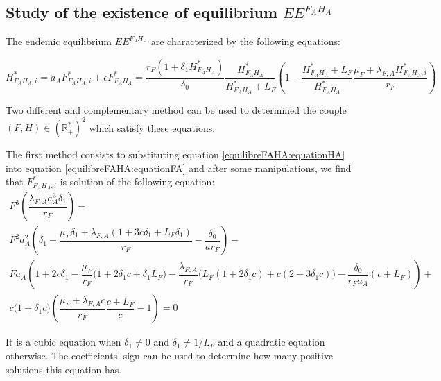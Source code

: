 \documentclass{article}
\newcommand{\lfa}{\lambda_{F, A}}
\begin{document}
\newpage



\newpage
\begin{appendices}
\section{Study of the existence of equilibrium $EE^{F_AH_A}$ \label{appendix:equilibreFAHA}}
The endemic equilibrium $EE^{F_AH_A}$ are characterized by the following equations:

\begin{subequations}
\begin{equation}
H^*_{F_AH_A, i} = a_A F^*_{F_AH_A, i} + c
\label{equilibreFAHA:equationHA}
\end{equation}
\begin{equation}
F^*_{F_AH_A} = \dfrac{r_F(1+\delta_1 H^*_{F_AH_A})}{\delta_0} \dfrac{H^*_{F_AH_A}}{H^*_{F_AH_A} + L_F} \left(1 - \dfrac{H^*_{F_AH_A} + L_F}{H^*_{F_AH_A}}\dfrac{\mu_F + \lfa H^*_{F_AH_A, i}}{r_F} \right)
\label{equilibreFAHA:equationFA}
\end{equation}
\end{subequations}

Two different and complementary method can be used to determined the couple $(F, H) \in (\mathbb{R}^*_+)^2$ which satisfy these equations.

The first method consists to substituting equation \eqref{equilibreFAHA:equationHA} into equation \eqref{equilibreFAHA:equationFA} and after some manipulations, we find that $F^*_{F_AH_A, i}$ is solution of the following equation:
\begin{multline}
F^3 \left(\dfrac{\lfa a_A^3 \delta_1}{r_F} \right) - \\
F^2 a_A^2 \left(\delta_1 - \dfrac{\mu_F \delta_1 + \lfa (1 + 3c\delta_1 + L_F \delta_1)}{r_F}- \dfrac{\delta_0}{a r_F} \right) - \\
F a_A  \left(1+ 2c\delta_1 - \dfrac{\mu_F}{r_F} \Big(1+2\delta_1 c + \delta_1 L_F\Big) - \dfrac{\lfa}{r_F} \Big(L_F(1+2\delta_1 c) + c(2 + 3\delta_1 c) \Big) - \dfrac{\delta_0}{r_F a_A} (c+L_F) \right) + \\ c\Big(1 + \delta_1 c \Big) \left(\dfrac{\mu_F + \lfa c}{r_F} \dfrac{c + L_F}{c} -1\right) = 0
\label{equilibreFAHA:cubique}
\end{multline}

It is a cubic equation when $\delta_1 \neq 0$ and $\delta_1 \neq 1/L_F$ and a quadratic equation otherwise. 
The coefficients' sign can be used to determine how many positive solutions this equation has.



\end{appendices}
\end{document}
